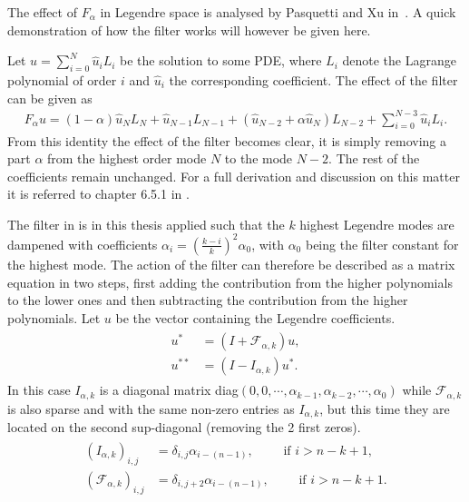 The effect of $F_{\alpha}$ in Legendre space is analysed
by Pasquetti and Xu in~\cite{Pasquetti}. A quick demonstration of 
how the filter works will however be given here. 

Let $u = \sum_{i=0}^{N} \hat{u}_i L_i$ be the solution to some PDE, where $L_i$ denote the Lagrange
polynomial of order $i$ and $\hat{u}_i$ the corresponding coefficient. The effect of the filter
can be given as 
%
\begin{align}
    F_{\alpha} u = 
    (1-\alpha)\hat{u}_{N}L_{N}
    +\hat{u}_{N-1}L_{N-1} +
    (\hat{u}_{N-2}+\alpha \hat{u}_{N})L_{N-2}
    +\sum_{i=0}^{N-3}\hat{u}_{i}L_{i}.
    \label{eq:filtereffect}
\end{align}
%
From this identity the effect of the filter becomes clear, it is simply removing a part $\alpha $
from the highest order mode $N$ to the mode $N-2$. The rest of the coefficients remain unchanged.
For a full derivation and discussion on this matter it is referred to chapter 6.5.1 in 
\cite{Karniadakis}.

The filter in  is in this thesis applied such that the $k$ highest Legendre modes
are dampened with coefficients $\alpha_i = (\frac{k-i}{k})^2\alpha_0 $, with $\alpha_0$ being the filter constant
for the highest mode. The action of the filter can therefore be described as 
a matrix equation in two steps, first adding the contribution from the higher polynomials to the 
lower ones and then subtracting the contribution from the higher polynomials. Let $u$ be the 
vector containing the Legendre coefficients.
\begin{align}
    \begin{split}
    u^* &=(I+\mathcal{F}_{\alpha,k})u, \\
    u^{**} &= (I-I_{\alpha,k})u^*.
    \end{split}
    \label{eq:filterstepwise}
\end{align}
In this case $I_{\alpha,k}$ is a diagonal matrix 
diag$(0,0,\cdots,\alpha_{k-1},\alpha_{k-2},\cdots,\alpha_0)$ 
while $\mathcal{F}_{\alpha,k}$ is also sparse and with the same non-zero entries as $I_{\alpha,k}$,
but this time they are located on the second sup-diagonal (removing the 2 first zeros). 
\begin{align}
    \begin{split}
        (I_{\alpha,k})_{i,j} &= \delta_{i,j}\alpha_{i-(n-1)}, \qquad \text{ if } i > n-k+1, \\
     (\mathcal{F}_{\alpha,k})_{i,j} &= \delta_{i,j+2}\alpha_{i-(n-1)}, \qquad \text{ if } i > n-k+1.
    \end{split}
    \label{eq:helpmatrices}
\end{align}

